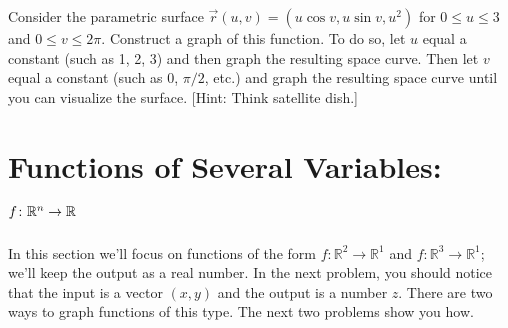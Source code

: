\begin{problem}\label{second parametric surface example}%
%
 Consider the parametric surface $\vec r(u,v)=(u\cos v, u\sin v, u^2)$ for $0\leq u\leq 3$ and $0\leq v\leq 2 \pi$.
 Construct a graph of this function. To do so, let $u$ equal a constant (such as 1, 2, 3) and then graph the resulting space curve.  Then let $v$ equal a constant (such as 0, $\pi/2$, etc.) and graph the resulting space curve until you can visualize the surface. [Hint: Think satellite dish.] 
\end{problem}


\section{Functions of Several Variables: $f\colon \mathbb{R}^n \to \mathbb{R}$}

In this section we'll focus on functions of the form $f\colon \mathbb{R}^2\to\mathbb{R}^1$ and $f\colon \mathbb{R}^3\to\mathbb{R}^1$; we'll keep the output as a real number. In the next problem, you should notice that the input is a vector $(x,y)$ and the output is a number $z$. There are two ways to graph functions of this type.  The next two problems show you how. 

